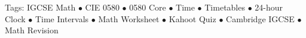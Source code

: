 \documentclass[11pt,a4paper]{article}
\begin{document}
\vspace{14pt}
\begin{center}
  \sffamily\scriptsize\textcolor{textmuted}{
    Tags: IGCSE Math $\bullet$ CIE 0580 $\bullet$ 0580 Core $\bullet$ Time $\bullet$ Timetables $\bullet$ 24-hour Clock $\bullet$ Time Intervals $\bullet$ Math Worksheet $\bullet$ Kahoot Quiz $\bullet$ Cambridge IGCSE $\bullet$ Math Revision
  }
\end{center}
\end{document}
